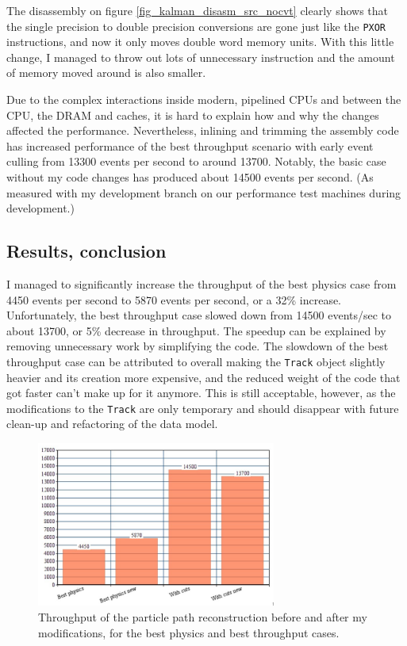 \documentclass[12pt]{article}
\newcommand{\code}[1]{\texttt{#1}}
\begin{document}
The disassembly on figure \ref{fig_kalman_disasm_src_nocvt} clearly shows that the single precision to double precision conversions are gone just like the \code{PXOR} instructions, and now it only moves double word memory units. With this little change, I managed to throw out lots of unnecessary instruction and the amount of memory moved around is also smaller.

Due to the complex interactions inside modern, pipelined CPUs and between the CPU, the DRAM and caches, it is hard to explain how and why the changes affected the performance. Nevertheless, inlining and trimming the assembly code has increased performance of the best throughput scenario with early event culling from 13300 events per second to around 13700. Notably, the basic case without my code changes has produced about 14500 events per second. \small (As measured with my development branch on our performance test machines during development.) \normalsize


\subsection{Results, conclusion}

I managed to significantly increase the throughput of the best physics case from 4450 events per second to 5870 events per second, or a 32\% increase. Unfortunately, the best throughput case slowed down from 14500 events/sec to about 13700, or 5\% decrease in throughput. The speedup can be explained by removing unnecessary work by simplifying the code. The slowdown of the best throughput case can be attributed to overall making the \code{Track} object slightly heavier and its creation more expensive, and the reduced weight of the code that got faster can't make up for it anymore. This is still acceptable, however, as the modifications to the \code{Track} are only temporary and should disappear with future clean-up and refactoring of the data model.

\begin{figure}[H]
	\begin{center}
		\includegraphics[width=0.7\textwidth]{kalmanfit_throughput_results_lowquality}
	\end{center}
	\caption[Throughput improvement by the Kalman fitter optimization]{Throughput of the particle path reconstruction before and after my modifications, for the best physics and best throughput cases.}
	\label{fig_kalmanfit_results_throughput}
\end{figure}
\end{document}
